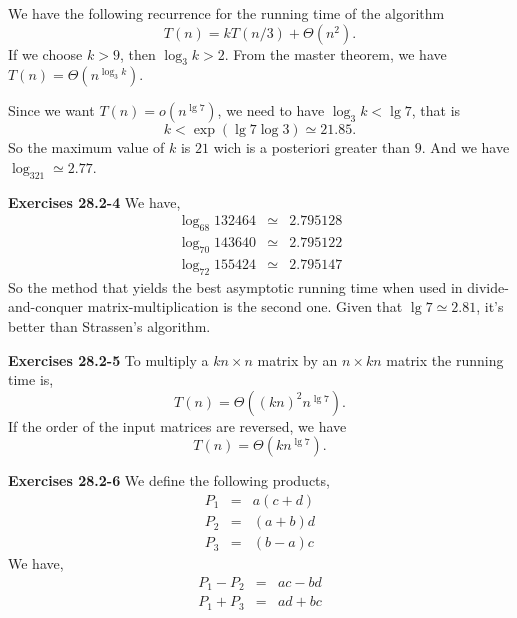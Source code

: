 \documentclass[a4paper,12pt]{article}
\newcommand{\newpar}[1]
{\bigskip \noindent \textbf{Exercises #1} \newline}
\begin{document}
We have the following recurrence for the running time of the algorithm
\[ T(n) = k T(n/3) + \Theta(n^2).\]
If we choose $k > 9$, then $\log_3k > 2$.  From the
master theorem, we have $T(n) = \Theta(n^{\log_3k})$.

Since we want $T(n) = o(n^{\lg 7})$, we need to have $\log_3k < \lg
7$, that is
\[ k < \exp(\lg 7 \log 3) \simeq 21.85.\]
So the maximum value of $k$ is $21$ wich is a posteriori greater than
$9$.  And we have $\log_321 \simeq 2.77$.

\newpar{28.2-4}
We have,
\begin{eqnarray*}
\log_{68} 132464 &\simeq& 2.795128 \\
\log_{70} 143640 &\simeq& 2.795122 \\
\log_{72} 155424 &\simeq& 2.795147 
\end{eqnarray*}
So the method that yields the best asymptotic running time when used
in divide-and-conquer matrix-multiplication is the second one.  Given
that $\lg 7 \simeq 2.81$, it's better than Strassen's algorithm.

\newpar{28.2-5}
To multiply a $kn\times n$ matrix by an $n \times kn$ matrix the
running time is,
\[ T(n) = \Theta((k n)^2 n^{\lg 7}).\]
If the order of the input matrices are reversed, we have
\[ T(n) = \Theta(k n^{\lg 7}).\]

\newpar{28.2-6}
We define the following products,
\begin{eqnarray*}
  P_1 &=& a(c+d) \\
  P_2 &=& (a+b)d \\
  P_3 &=& (b-a)c 
\end{eqnarray*}
We have,
\begin{eqnarray*}
  P_1 - P_2 &=& ac-bd \\
  P_1 + P_3 &=& ad+bc
\end{eqnarray*}
\end{document}
